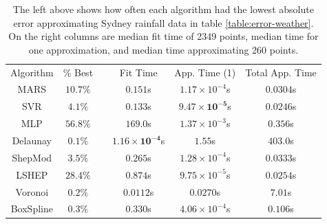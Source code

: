 \documentclass[smallextended,final]{svjour3}       %
\begin{document}
\begin{appendix}
\begin{table}
  \centering
  \begin{tabular}{|c|c| c |c|c|c|}
    \cline{1-2}\cline{4-6}
    Algorithm & \% Best &  & Fit Time & App. Time (1) & Total App. Time\\
    \cline{1-2}\cline{4-6}
    MARS & $10.7\%$ &  & $0.151$s & $1.17 \times 10^{-4}$s & $0.0304$s\\
    SVR & $4.1\%$ &  & $0.133$s & $\mathbf{9.47 \times 10^{-5}}$s & $\mathbf{0.0246}$s\\
    MLP & $\mathbf{56.8}\%$ &  & $169.0$s & $1.37 \times 10^{-3}$s & $0.356$s\\
    Delaunay & $0.1\%$ &  & $\mathbf{1.16 \times 10^{-4}}$s & $1.55$s & $403.0$s\\
    ShepMod & $3.5\%$ &  & $0.265$s & $1.28 \times 10^{-4}$s & $0.0333$s\\
    LSHEP & $\mathit{28.4}\%$ &  & $0.874$s & $\mathit{9.75 \times 10^{-5}}$s & $\mathit{0.0254}$s\\
    Voronoi & $0.2\%$ &  & $\mathit{0.0112}$s & $0.0270$s & $7.01$s\\
    BoxSpline & $0.3\%$ &  & $0.330$s & $4.06 \times 10^{-4}$s & $0.106$s\\
    \cline{1-2}\cline{4-6}
  \end{tabular}
  \caption{The left above shows how often each algorithm had the
    lowest absolute error approximating Sydney rainfall data in table
    \ref{table:error-weather}. On the right columns are median fit
    time of 2349 points, median time for one approximation, and median
    time approximating 260 points.}
  \label{table:best-weather}
\end{table}



\end{appendix}
\end{document}
